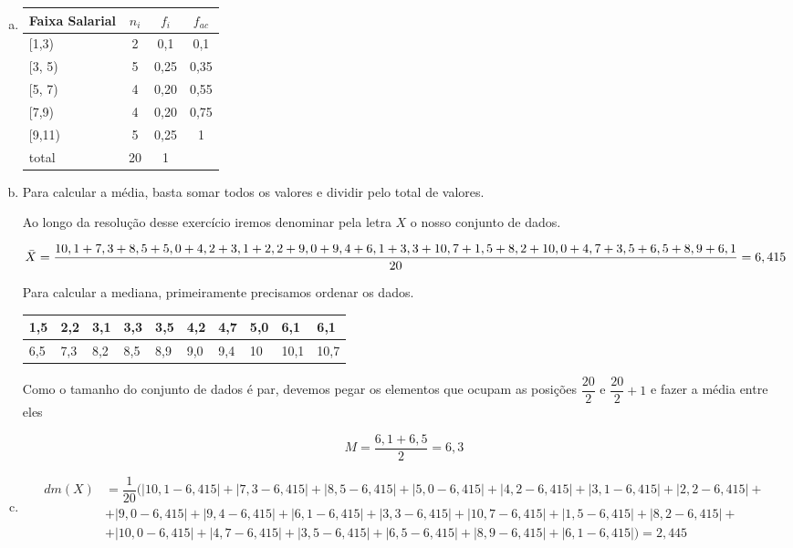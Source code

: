 \documentclass{article}
\begin{document}
\begin{enumerate}[a)]
\item 

\begin{table}[ht]
\centering
\begin{tabular}{lccc}
\hline
Faixa Salarial & $n_i$ & $f_i$ & $f_{ac}$ \\ \hline
{[}1,3)        & 2     & 0,1   & 0,1    \\
{[}3, 5)       & 5     & 0,25   & 0,35    \\
{[}5, 7)       & 4     & 0,20  & 0,55   \\
{[}7,9)       & 4     & 0,20  & 0,75      \\
{[}9,11)       & 5     & 0,25  & 1      \\
total          & 20    & 1     &        \\ \hline
\end{tabular}
\end{table}

\item 
Para calcular a média, basta somar todos os valores e dividir pelo total de valores. 

Ao longo da resolução desse exercício iremos denominar pela letra $X$ o nosso conjunto de dados.

{\tiny $$\Bar{X} = \dfrac{10,1 + 7,3 + 8,5 + 5,0 + 4,2 + 3,1 + 2,2 + 9,0 + 9,4 + 6,1 + 3,3 + 10,7 + 1,5 + 8,2 + 10,0 + 4,7 + 3,5 + 6,5 + 8,9 + 6,1}{20}=6,415$$}

Para calcular a mediana, primeiramente precisamos ordenar os dados. 

\begin{table}[ht]
\centering
\begin{tabular}{|l|l|l|l|l|l|l|l|l|l|}
\hline
1,5 & 2,2 & 3,1 & 3,3 & 3,5 & 4,2 & 4,7 & 5,0 & 6,1  & 6,1  \\ \hline
6,5 & 7,3 & 8,2 & 8,5 & 8,9 & 9,0 & 9,4 & 10  & 10,1 & 10,7 \\ \hline
\end{tabular}
\end{table}

Como o tamanho do conjunto de dados é par, devemos pegar os elementos que ocupam as posições $\dfrac{20}{2}$ e $\dfrac{20}{2} + 1$ e fazer a média entre eles

$$M = \dfrac{6,1 + 6,5}{2} = 6,3$$

\item 

{\tiny \begin{align*}
dm(X) &= \dfrac{1}{20} (|10,1 -6,415| + |7,3 -6,415| + |8,5 -6,415| + |5,0 -6,415| + |4,2 -6,415| + |3,1 -6,415| + |2,2 -6,415|+ \\
& + |9,0 -6,415| + |9,4 -6,415|+ |6,1 -6,415| + |3,3 -6,415| + |10,7 -6,415| + |1,5 -6,415| + |8,2 -6,415| +\\
&+|10,0  -6,415|+ |4,7 -6,415| + |3,5 -6,415| + |6,5 -6,415| + |8,9 -6,415| + |6,1 -6,415|) = 2,445
\end{align*}}


\end{enumerate}
\end{document}
